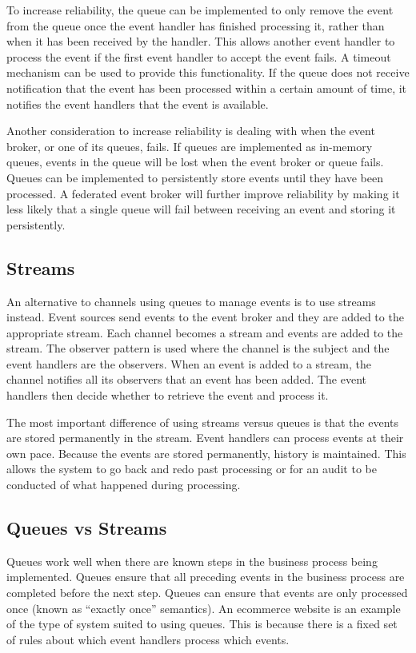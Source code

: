 To increase reliability, the queue can be implemented to only remove the event from the queue once the event handler has finished processing it,
rather than when it has been received by the handler.
This allows another event handler to process the event if the first event handler to accept the event fails.
A timeout mechanism can be used to provide this functionality.
If the queue does not receive notification that the event has been processed within a certain amount of time,
it notifies the event handlers that the event is available.

Another consideration to increase reliability is dealing with when the event broker, or one of its queues, fails.
If queues are implemented as in-memory queues, events in the queue will be lost when the event broker or queue fails.
Queues can be implemented to persistently store events until they have been processed.
A federated event broker will further improve reliability by making it less likely that a single queue will fail between receiving an event and storing it persistently.

\subsection{Streams}

An alternative to channels using queues to manage events is to use streams instead.
Event sources send events to the event broker and they are added to the appropriate stream.
Each channel becomes a stream and events are added to the stream.
The observer pattern is used where the channel is the subject and the event handlers are the observers.
When an event is added to a stream, the channel notifies all its observers that an event has been added.
The event handlers then decide whether to retrieve the event and process it.

The most important difference of using streams versus queues is that the events are stored permanently in the stream.
Event handlers can process events at their own pace.
Because the events are stored permanently, history is maintained.
This allows the system to go back and redo past processing or for an audit to be conducted of what happened during processing.

\subsection{Queues vs Streams}

Queues work well when there are known steps in the business process being implemented.
Queues ensure that all preceding events in the business process are completed before the next step.
Queues can ensure that events are only processed once (known as ``exactly once'' semantics).
An ecommerce website is an example of the type of system suited to using queues.
This is because there is a fixed set of rules about which event handlers process which events.

